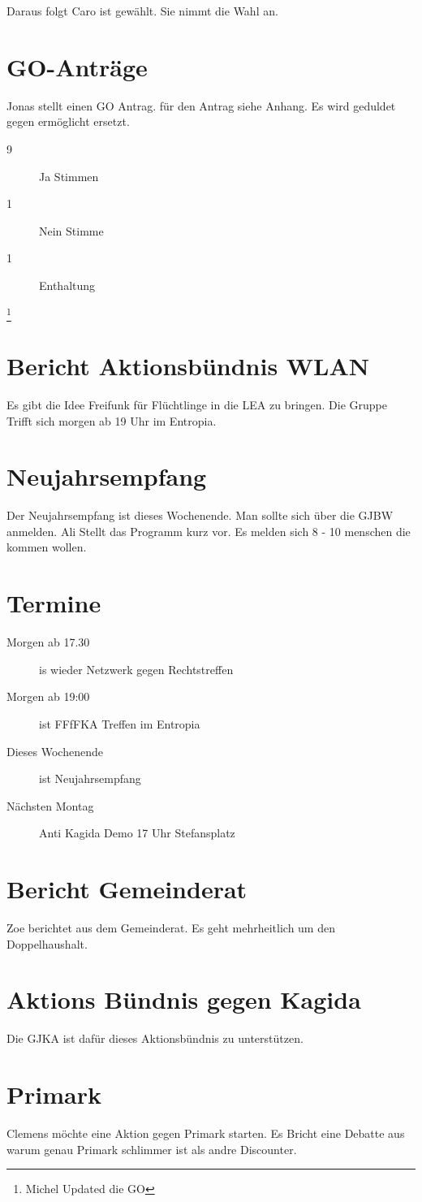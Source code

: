 \documentclass[10pt,a4paper]{article}
\begin{document}
Daraus folgt Caro ist gewählt. Sie nimmt die Wahl an.

\section{GO-Anträge}
Jonas stellt einen GO Antrag. für den Antrag siehe Anhang. Es wird geduldet gegen ermöglicht ersetzt. 

\begin{description}
\item[9] Ja Stimmen
\item[1] Nein Stimme
\item[1] Enthaltung
\end{description}

\footnote{Michel Updated die GO}

\section{Bericht Aktionsbündnis WLAN}
Es gibt die Idee Freifunk für Flüchtlinge in die LEA zu bringen. Die Gruppe Trifft sich morgen ab 19 Uhr im Entropia.

\section{Neujahrsempfang}
Der Neujahrsempfang ist dieses Wochenende. Man sollte sich über die GJBW anmelden. Ali Stellt das Programm kurz vor. Es melden sich 8 - 10 menschen die kommen wollen.

\section{Termine}
\begin{description}
\item [Morgen ab 17.30] is wieder Netzwerk gegen Rechtstreffen
\item [Morgen ab 19:00] ist FFfFKA Treffen im Entropia
\item [Dieses Wochenende] ist Neujahrsempfang
\item [Nächsten Montag] Anti Kagida Demo 17 Uhr Stefansplatz
\end{description}


\section{Bericht Gemeinderat}
Zoe berichtet aus dem Gemeinderat. Es geht mehrheitlich um den Doppelhaushalt. 

\section{Aktions Bündnis gegen Kagida}
Die GJKA ist dafür dieses Aktionsbündnis zu unterstützen.

\section{Primark}
Clemens möchte eine Aktion gegen Primark starten. Es Bricht eine Debatte aus warum genau Primark schlimmer ist als andre Discounter.
\end{document}
